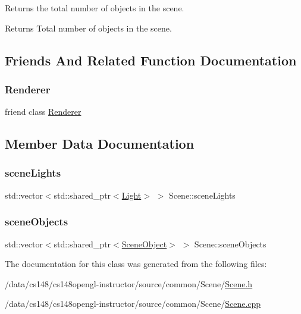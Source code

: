 Returns the total number of objects in the scene. 

\begin{DoxyReturn}{Returns}
Total number of objects in the scene. 
\end{DoxyReturn}


\subsection{Friends And Related Function Documentation}
\hypertarget{class_scene_a70538530bc36e033e360880ef311df61}{}\label{class_scene_a70538530bc36e033e360880ef311df61} 
\subsubsection{\texorpdfstring{Renderer}{Renderer}}
{\footnotesize\ttfamily friend class \hyperlink{class_renderer}{Renderer}\hspace{0.3cm}{\ttfamily [friend]}}



\subsection{Member Data Documentation}
\hypertarget{class_scene_a847f4f9c485a56b084a1340811f0e726}{}\label{class_scene_a847f4f9c485a56b084a1340811f0e726} 
\subsubsection{\texorpdfstring{scene\+Lights}{sceneLights}}
{\footnotesize\ttfamily std\+::vector$<$std\+::shared\+\_\+ptr$<$\hyperlink{class_light}{Light}$>$ $>$ Scene\+::scene\+Lights\hspace{0.3cm}{\ttfamily [private]}}

\hypertarget{class_scene_a871382922b2a04d7883cf6d34529b5df}{}\label{class_scene_a871382922b2a04d7883cf6d34529b5df} 
\subsubsection{\texorpdfstring{scene\+Objects}{sceneObjects}}
{\footnotesize\ttfamily std\+::vector$<$std\+::shared\+\_\+ptr$<$\hyperlink{class_scene_object}{Scene\+Object}$>$ $>$ Scene\+::scene\+Objects\hspace{0.3cm}{\ttfamily [private]}}



The documentation for this class was generated from the following files\+:\begin{DoxyCompactItemize}
\item 
/data/cs148/cs148opengl-\/instructor/source/common/\+Scene/\hyperlink{_scene_8h}{Scene.\+h}\item 
/data/cs148/cs148opengl-\/instructor/source/common/\+Scene/\hyperlink{_scene_8cpp}{Scene.\+cpp}\end{DoxyCompactItemize}
